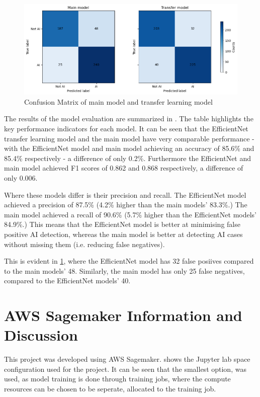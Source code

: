 \begin{figure}[h]
    \centering
    \includegraphics[width=0.9\linewidth]{figures/confusion_matrix.png} %
    \centering
    \caption{Confusion Matrix of main model and transfer learning model} %
    \label{fig:confusion_matrixes} %
\end{figure}

The results of the model evaluation are summarized in . The table highlights the key performance indicators for each model. It can be seen that the EfficientNet transfer learning model and the main model have very comparable performance - with the EfficientNet model and main model achieving an accuracy of 85.6\% and 85.4\% respectively - a difference of only 0.2\%. Furthermore the EfficientNet and main model achieved F1 scores of 0.862 and 0.868 respectively, a difference of only 0.006.

Where these models differ is their precision and recall. The EfficientNet model achieved a precision of 87.5\% (4.2\% higher than the main models' 83.3\%.) The main model achieved a recall of 90.6\% (5.7\% higher than the EfficientNet models' 84.9\%.) This means that the EfficientNet model is better at minimising false positive AI detection, whereas the main model is better at detecting AI cases without missing them (i.e. reducing false negatives). 

This is evident in \cref{fig:confusion_matrixes}, where the EfficientNet model has 32 false posiives compared to the main models' 48. Similarly, the main model has only 25 false negatives, compared to the EfficientNet models' 40.

\section{AWS Sagemaker Information and Discussion}

This project was developed using AWS Sagemaker.  shows the Jupyter lab space configuration used for the project. It can be seen that the smallest option,  was used, as model training is done through training jobs, where the compute resources can be chosen to be seperate, allocated to the training job.

